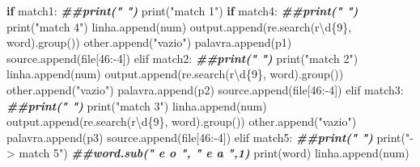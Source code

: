 \documentclass[
  12pt,
]{article}
\newenvironment{Shaded}{\begin{snugshade}}{\end{snugshade}}
\newcommand{\ControlFlowTok}[1]{\textcolor[rgb]{0.13,0.29,0.53}{\textbf{#1}}}
\newcommand{\DecValTok}[1]{\textcolor[rgb]{0.00,0.00,0.81}{#1}}
\newcommand{\DocumentationTok}[1]{\textcolor[rgb]{0.56,0.35,0.01}{\textbf{\textit{#1}}}}
\newcommand{\FunctionTok}[1]{\textcolor[rgb]{0.00,0.00,0.00}{#1}}
\newcommand{\NormalTok}[1]{#1}
\newcommand{\SpecialCharTok}[1]{\textcolor[rgb]{0.00,0.00,0.00}{#1}}
\newcommand{\StringTok}[1]{\textcolor[rgb]{0.31,0.60,0.02}{#1}}
\begin{document}
\begin{Shaded}
\begin{Highlighting}[]
                \ControlFlowTok{if}\NormalTok{ match1}\SpecialCharTok{:}
                        \DocumentationTok{\#\#print("   ")}
                        \FunctionTok{print}\NormalTok{(}\StringTok{"match 1"}\NormalTok{)}
                        \ControlFlowTok{if}\NormalTok{ match4}\SpecialCharTok{:}
                            \DocumentationTok{\#\#print("   ")}
                            \FunctionTok{print}\NormalTok{(}\StringTok{"match 4"}\NormalTok{)}
                            \FunctionTok{linha.append}\NormalTok{(num)}
                            \FunctionTok{output.append}\NormalTok{(}\FunctionTok{re.search}\NormalTok{(r}\StringTok{\textquotesingle{}\textbackslash{}d\{9\}\textquotesingle{}}\NormalTok{, word)}\FunctionTok{.group}\NormalTok{())}
                            \FunctionTok{other.append}\NormalTok{(}\StringTok{"vazio"}\NormalTok{)}
                            \FunctionTok{palavra.append}\NormalTok{(p1)}
                            \FunctionTok{source.append}\NormalTok{(file[}\DecValTok{46}\SpecialCharTok{:{-}}\DecValTok{4}\NormalTok{])}
\NormalTok{                elif match2}\SpecialCharTok{:}
                            \DocumentationTok{\#\#print("   ")}
                            \FunctionTok{print}\NormalTok{(}\StringTok{"match 2"}\NormalTok{)}
                            \FunctionTok{linha.append}\NormalTok{(num)}
                            \FunctionTok{output.append}\NormalTok{(}\FunctionTok{re.search}\NormalTok{(r}\StringTok{\textquotesingle{}\textbackslash{}d\{9\}\textquotesingle{}}\NormalTok{, word)}\FunctionTok{.group}\NormalTok{())}
                            \FunctionTok{other.append}\NormalTok{(}\StringTok{"vazio"}\NormalTok{)}
                            \FunctionTok{palavra.append}\NormalTok{(p2)}
                            \FunctionTok{source.append}\NormalTok{(file[}\DecValTok{46}\SpecialCharTok{:{-}}\DecValTok{4}\NormalTok{])}
\NormalTok{                elif match3}\SpecialCharTok{:}
                            \DocumentationTok{\#\#print("   ")}
                            \FunctionTok{print}\NormalTok{(}\StringTok{"match 3"}\NormalTok{)}
                            \FunctionTok{linha.append}\NormalTok{(num)}
                            \FunctionTok{output.append}\NormalTok{(}\FunctionTok{re.search}\NormalTok{(r}\StringTok{\textquotesingle{}\textbackslash{}d\{9\}\textquotesingle{}}\NormalTok{, word)}\FunctionTok{.group}\NormalTok{())}
                            \FunctionTok{other.append}\NormalTok{(}\StringTok{"vazio"}\NormalTok{)}
                            \FunctionTok{palavra.append}\NormalTok{(p3)}
                            \FunctionTok{source.append}\NormalTok{(file[}\DecValTok{46}\SpecialCharTok{:{-}}\DecValTok{4}\NormalTok{])}
\NormalTok{                elif match5}\SpecialCharTok{:}
                            \DocumentationTok{\#\#print("   ")}
                            \FunctionTok{print}\NormalTok{(}\StringTok{"{-}\textgreater{} match 5"}\NormalTok{)}
                            \DocumentationTok{\#\#word.sub(" e o ", " e a ",1)}
                            \FunctionTok{print}\NormalTok{(word)}
                            \FunctionTok{linha.append}\NormalTok{(num)}


\end{Highlighting}
\end{Shaded}
\end{document}

